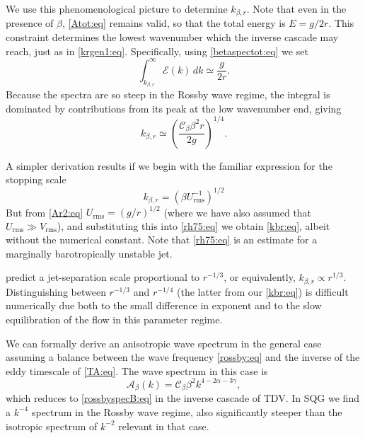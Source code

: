 \documentclass{jfm}
\newcommand{\ca}  [1]{\mathcal{#1}}
\newcommand{\rms} {\mathrm{rms}}
\begin{document}
We use this phenomenological picture to determine $k_{\beta,r}$.  Note
that even in the presence of $\beta$, \eqref{Atot:eq} remains valid,
so that the total energy is $E = g/2r$. This constraint determines the
lowest wavenumber which the inverse cascade may reach, just as in
\eqref{krgen1:eq}.  Specifically, using \eqref{betaspectot:eq} we set
\begin{equation}
\int_{k_{\beta,r}}^{\infty} \ca{E}(k) \, dk \simeq \frac{g}{2r}.
\label{intAros:eq}
\end{equation}
Because the spectra are so steep in the Rossby wave regime, the
integral is dominated by contributions from its peak at the low
wavenumber end, giving
\begin{equation}
k_{\beta,r} \simeq \left(\frac{\ca{C}_{\beta}\beta^2r}{2g}\right)^{1/4}.
\label{kbr:eq}
\end{equation}

A simpler derivation results if we begin with the
familiar expression for the stopping scale \citep{Rhines75}
\begin{equation}
k_{\beta,r} = \left(\beta U_{\rms}^{-1}\right)^{1/2}
\label{rh75:eq}
\end{equation}
But from \eqref{Ar2:eq} $U_{\rms} = (g/r)^{1/2}$ (where we have also
assumed that $U_{\rms}\gg V_{\rms}$), and substituting this into
\eqref{rh75:eq} we obtain \eqref{kbr:eq}, albeit without the numerical
constant. Note that \eqref{rh75:eq} is an estimate for a marginally
barotropically unstable jet.

\mbox{} \citet*{manfroi99} predict a jet-separation scale pro\-por\-tion\-al
to $r^{-1/3}$, or equi\-va\-lent\-ly, $k_{\beta,r} \propto r^{1/3}$.
Distinguishing between $r^{-1/3}$ and $r^{-1/4}$ (the latter from our
\eqref{kbr:eq}) is difficult numerically due both to the small difference
in exponent and to the slow equilibration of the flow in this parameter
regime.

We can formally derive an anisotropic wave spectrum in the general
case assuming a balance between the wave frequency \eqref{rossby:eq}
and the inverse of the eddy timescale of \eqref{TA:eq}. The wave
spectrum in this case is
\begin{equation}
\ca{A}_{\beta}(k) = \ca{C}_{\beta} \beta^2 k^{4-2\alpha-3\gamma},
\label{rossbyspecA:eq}
\end{equation}
which reduces to \eqref{rossbyspecB:eq} in the inverse cascade of
TDV. In SQG we find a $k^{-4}$ spectrum in the Rossby
wave regime, also significantly steeper than the isotropic spectrum of
$k^{-2}$ relevant in that case.
\end{document}
